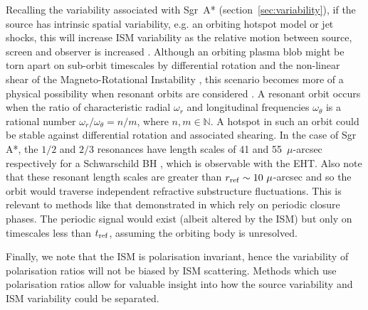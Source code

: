 Recalling the variability associated with Sgr~A* (section~\ref{sec:variability}), if the source has intrinsic spatial variability, e.g. an orbiting hotspot model \citep{Doeleman_2009b} or jet shocks, this will increase ISM variability as the relative motion between source, screen and observer is increased \citep{Blecher_2016}. Although an orbiting plasma blob might be torn apart on sub-orbit timescales by differential rotation and the non-linear shear of the Magneto-Rotational Instability \citep[(MRI)][]{Balbus_1991}, this scenario becomes more of a physical possibility when resonant orbits are considered \citep{Brink_2015}. A resonant orbit occurs when the ratio of characteristic radial $\omega_r$ and longitudinal frequencies $\omega_\theta$ is a rational number $\omega_r/\omega_\theta = n/m$, where $n,m \in \mathbb{N}$. A hotspot in such an orbit could be stable against differential rotation and associated shearing. In the case of Sgr A*, the $1/2$ and $2/3$ resonances have  length scales of 41 and 55~$\mu$-arcsec respectively for a Schwarschild BH \citep{Brink_2015}, which is observable with the EHT. Also note that these resonant length scales are greater than $r_{\rm ref} \sim 10\ \mu$-arcsec and so the orbit would traverse independent refractive substructure fluctuations. This is relevant to methods like that demonstrated in \citet{Doeleman_2009b} which rely on periodic closure phases. The periodic signal would exist (albeit altered by the ISM) but only on timescales less than $t_{\rm ref}$, assuming the orbiting body is unresolved.


Finally, we note that the ISM is polarisation invariant, hence the variability of polarisation ratios will not be biased by ISM scattering. Methods which use polarisation ratios \citep[e.g.][]{Johnson_2014} allow for valuable insight into how the source variability and ISM variability could be separated.



